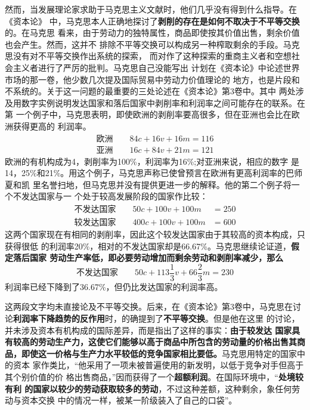 然而，当发展理论家求助于马克思主义文献时，他们几乎没有得到什么指导。在《资本论》
中，马克思本人正确地探讨了\textbf{剥削的存在是如何不取决于不平等交换}的。在马克思
看来，由于劳动力的独特属性，商品即使按其价值出售，剩余价值也会产生。然而，这并不
排除不平等交换可以构成另一种榨取剩余的手段。马克思没有对不平等交换作出系统的探索，
而对作了这种探索的重商主义者和空想社会主义者进行了严厉的批判。马克思自己没能写出
计划在《资本论》中论述世界市场的那一卷，他少数几次提及国际贸易中劳动力价值理论的
地方，也是片段和不系统的。关于这一问题的最重要的三处论述在《资本论》第3卷中。其中
两处涉及用数字实例说明发达国家和落后国家中剥削率和利润率之间可能存在的联系。在第
一个例子中，马克思表明，即使欧洲的剥削率要高很多，但在亚洲也会比在欧洲获得更高的
利润率。
\begin{gather*}
欧洲\qquad 84c+16v+16m=116 \\
亚洲\qquad 16c+84v+21m=121
\end{gather*}
欧洲的有机构成为4，剥削率为100\%，利润率为16\%;对亚洲来说，相应的数字
是14，25\%和21\%。用这个例子，马克思声称已使曾预言在欧洲有更高利润率的巴师夏和凯
里名誉扫地，但马克思并没有提供更进一步的解释。他的第二个例子将一个不发达国家与一
个处于较高发展阶段的国家作比较：
\begin{equation*}
\begin{aligned}
不发达国家\qquad 50c+100v+100m &=250 \\
较发达国家\qquad 400c+100v+100m &=600
\end{aligned}
\end{equation*}
这两个国家现在有相同的剥削率，因此这个较发达国家由于其较高的资本构成，只获得很低
的利润率20\%，相对的不发达国家却是66.67\%。马克思继续论证道，\textbf{假定落后国家
  劳动生产率低，即必要劳动增加而剩余劳动和剥削率减少，那么}
\[不发达国家\qquad 50c+113\frac{1}{3}v+66\frac{2}{3}m=230\]
利润率已经下降到了36.67\%，但仍比发达国家的利润率高。

这两段文字均未直接论及不平等交换。后来，在《资本论》第3卷中，马克思在讨
论\textbf{利润率下降趋势的反作用}时，的确提到了\textbf{不平等交换}。但是他在这里
的讨论，并未涉及资本有机构成的国际差异，而是指出了这样的事实：\textbf{由于较发达
  国家具有较高的劳动生产力，这使它们能够以高于商品中所包含的劳动量的价格出售其商
  品，即使这一价格与生产力水平较低的竞争国家相比要低。}马克思用特定的国家中的资本
家作类比，“他采用了一项未被普遍使用的新发明，以低于竞争对手但高于其个别价值的价
格出售商品，”因而获得了一个\textbf{超额利润}。在国际环境中，“\textbf{处境较有利
  的国家以较少的劳动获取较多的劳动}，不过这种差额，这种剩余，象任何劳动与资本交换
中的情况一样，被某一阶级装入了自己的口袋”。

